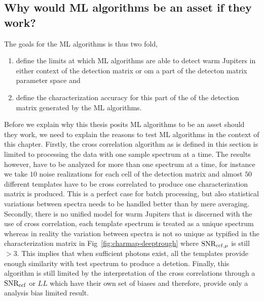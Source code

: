 \subsection{Why would ML algorithms be an asset if they work?}
The goals for the ML algorithms is thus two fold,
\begin{enumerate}
    \item define the limits at which ML algorithms are able to detect warm Jupiters in either context of the detection matrix or om a part of the detecton matrix parameter space and
    \item define the characterization accuracy for this part of the of the detection matrix generated by the ML algorithms.
\end{enumerate}
Before we explain why this thesis posits ML algorithms to be an asset should they work, we need to explain the reasons to test ML algorithms in the context of this chapter.
Firstly, the cross correlation algorithm as is defined in this section is limited to processing the data with one sample spectrum at a time.
The results however, have to be analyzed for more than one spectrum at a time, for instance we take $10$ noise realizations for each cell of the detection matrix and almost $50$ different templates have to be cross correlated to produce one characterization matrix is produced.
This is a perfect case for batch processing, but also statistical variations between spectra needs to be handled better than by mere averaging.
Secondly, there is no unified model for warm Jupiters that is discerned with the use of cross correlation, each template spectrum is treated as a unique spectrum whereas in reality the variation between spectra is not so unique as typified in the characterization matrix in Fig~\ref{fig:charmap-deeptrough} where $\rm{SNR_{ccf,\mu}}$ is still $>3$. 
This implies that when sufficient photons exist, all the templates provide enough similarity with test spectrum to produce a detetion.
Finally, this algorithm is still limited by the interpretation of the cross correlations through a $\rm{SNR_{ccf}}$ or $LL$ which have their own set of biases and therefore, provide only a analysis bias limited result.

